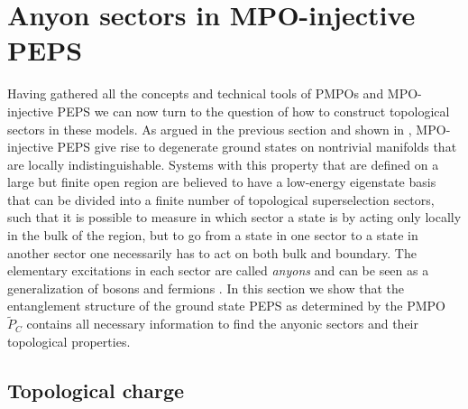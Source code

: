 \documentclass[12 pt]{article}
\begin{document}
\pagebreak

\section{Anyon sectors in MPO-injective PEPS} \label{sec:anyons}

Having gathered all the concepts and technical tools of PMPOs and MPO-injective PEPS we can now turn to the question of how to construct topological sectors in these models. As argued in the previous section and shown in \cite{MPOpaper}, MPO-injective PEPS give rise to degenerate ground states on nontrivial manifolds that are locally indistinguishable. Systems with this property that are defined on a large but finite open region are believed to have a low-energy eigenstate basis that can be divided into a finite number of topological superselection sectors, such that it is possible to measure in which sector a state is by acting only locally in the bulk of the region, but to go from a state in one sector to a state in another sector one necessarily has to act on both bulk and boundary. The elementary excitations in each sector are called \emph{anyons} and can be seen as a generalization of bosons and fermions \cite{wilczek,LeinaasMyrheim}. In this section we show that the entanglement structure of the ground state PEPS as determined by the PMPO $\tilde{P}_{C}$ contains all necessary information to find the anyonic sectors and their topological properties.

\subsection{Topological charge}\label{subsec:ansatz}
\end{document}
